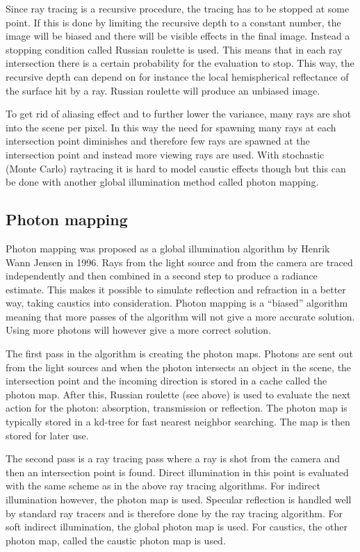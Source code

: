 \documentclass[a4paper]{report}
\begin{document}
Since ray tracing is a recursive procedure, the tracing has to be
stopped at some point. If this is done by limiting the recursive depth
to a constant number, the image will be biased and there will be
visible effects in the final image. Instead a stopping condition
called Russian roulette is used. This means that in each ray
intersection there is a certain probability for the evaluation to
stop. This way, the recursive depth can depend on for instance the
local hemispherical reflectance of the surface hit by a ray. Russian
roulette will produce an unbiased image.

To get rid of aliasing effect and to further lower the variance, many
rays are shot into the scene per pixel. In this way the need for
spawning many rays at each intersection point diminishes and therefore
few rays are spawned at the intersection point and instead more
viewing rays are used. With stochastic (Monte Carlo) raytracing it is
hard to model caustic effects though but this can be done with another
global illumination method called photon mapping.

\subsection{Photon mapping}

Photon mapping was proposed as a global illumination algorithm by
Henrik Wann Jensen \cite{jensen} in 1996. Rays from the light source
and from the camera are traced independently and then combined in a
second step to produce a radiance estimate. This makes it possible to
simulate reflection and refraction in a better way, taking caustics
into consideration. Photon mapping is a ``biased'' algorithm meaning
that more passes of the algorithm will not give a more accurate
solution. Using more photons will however give a more correct solution.

The first pass in the algorithm is creating the photon maps. Photons
are sent out from the light sources and when the photon intersects an
object in the scene, the intersection point and the incoming direction
is stored in a cache called the photon map. After this, Russian
roulette (see above) is used to evaluate the next action for the
photon: absorption, transmission or reflection. The photon map is
typically stored in a kd-tree for fast nearest neighbor searching. The
map is then stored for later use.

The second pass is a ray tracing pass where a ray is shot from the
camera and then an intersection point is found. Direct illumination in
this point is evaluated with the same scheme as in the above ray
tracing algorithms. For indirect illumination however, the photon map
is used. Specular reflection is handled well by standard ray tracers
and is therefore done by the ray tracing algorithm. For soft indirect
illumination, the global photon map is used. For caustics, the other
photon map, called the caustic photon map is used.
\end{document}
